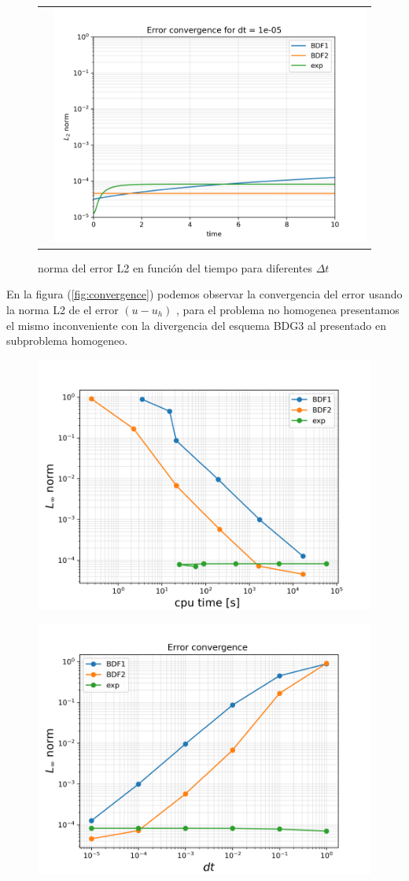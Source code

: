 \documentclass[11pt, spanish]{article}
\begin{document}
\begin{figure}[H]
\begin{tabular}{cc}
		&   \includegraphics[width=0.5\linewidth]{res/no_homogeneo/L2norm_dt_1e-05}
	\end{tabular}
	
	\caption{norma del error L2 en funci\'on del tiempo para  diferentes $\Delta t$}
	\label{fig:conveg hom}
\end{figure}
En la figura (\ref{fig:convergence}) podemos observar la convergencia del error usando la norma L2  de el error $(u-u_h)$ , para el problema no homogenea presentamos el mismo inconveniente con la divergencia del esquema BDG3 al presentado en subproblema homogeneo.

\begin{figure}[H]
	\centering
	\includegraphics[width=0.7\linewidth]{res/no_homogeneo/cpu-L2.pdf}
	\caption{}
	\label{fig:tiempodecalculo}
\end{figure}

\begin{figure}[H]
	\centering
	\includegraphics[width=0.7\linewidth]{res/no_homogeneo/dt-L2.pdf}
	\caption{}
	\label{fig:delta}
\end{figure}
\end{document}
